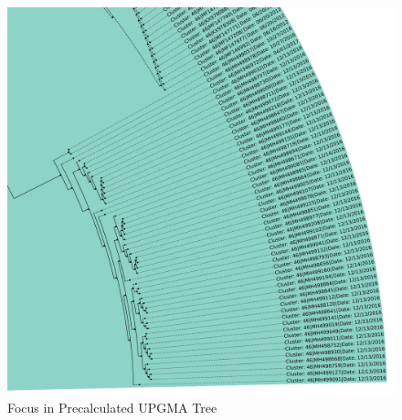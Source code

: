 \begin{figure}[hbt]
    \centering
    \includegraphics[width=\textwidth]{Graphics/identical.pdf}
    \caption[Focus in Precalculated \Acrshort{UPGMA} Tree]{Focus in Precalculated \Acrshort{UPGMA} Tree}
    \label{fig:focus}
\end{figure}

